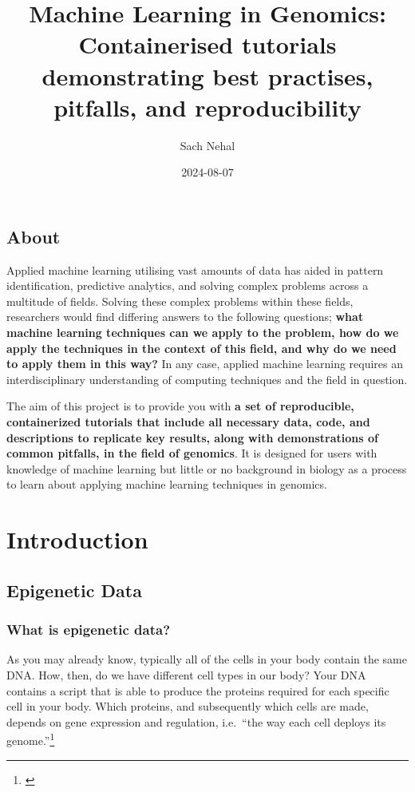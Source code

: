 \documentclass[
]{book}
\title{Machine Learning in Genomics: Containerised tutorials demonstrating best practises, pitfalls, and reproducibility}
\author{Sach Nehal}
\date{2024-08-07}
\begin{document}
\maketitle

{
\setcounter{tocdepth}{1}
\tableofcontents
}
\chapter*{About}\label{about}

Applied machine learning utilising vast amounts of data has aided in pattern identification, predictive analytics, and solving complex problems across a multitude of fields. Solving these complex problems within these fields, researchers would find differing answers to the following questions; \textbf{what machine learning techniques can we apply to the problem, how do we apply the techniques in the context of this field, and why do we need to apply them in this way?} In any case, applied machine learning requires an interdisciplinary understanding of computing techniques and the field in question.

The aim of this project is to provide you with \textbf{a set of reproducible, containerized tutorials that include all necessary data, code, and descriptions to replicate key results, along with demonstrations of common pitfalls, in the field of genomics}. It is designed for users with knowledge of machine learning but little or no background in biology as a process to learn about applying machine learning techniques in genomics.

\part{Introduction}\label{part-introduction}

\chapter{Epigenetic Data}\label{epigenetic-data}

\section{What is epigenetic data?}\label{what-is-epigenetic-data}

As you may already know, typically all of the cells in your body contain the same DNA. How, then, do we have different cell types in our body? Your DNA contains a script that is able to produce the proteins required for each specific cell in your body. Which proteins, and subsequently which cells are made, depends on gene expression and regulation, i.e.~``the way each cell deploys its genome.''\footnote{\citet{ralston2008}}
\end{document}
